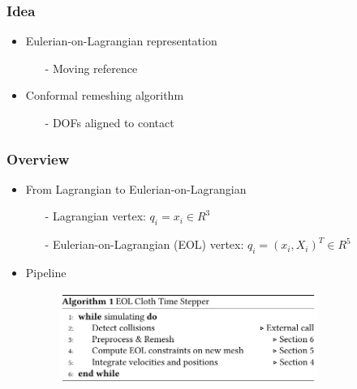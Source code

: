 \documentclass[serif,mathserif, 12pt]{beamer}
\begin{document}
\begin{frame}
  \frametitle{Idea}
  \begin{itemize}
  \item Eulerian-on-Lagrangian representation
    \begin{itemize}
    \item[-] Moving reference
    \end{itemize}
    \pause
  \item Conformal remeshing algorithm
    \begin{itemize}
    \item[-] DOFs aligned to contact
    \end{itemize}
  \end{itemize}
\end{frame}

\begin{frame}
  \frametitle{Overview}
  \begin{itemize}
  \item From Lagrangian to Eulerian-on-Lagrangian
    \begin{itemize}
    \item[-] Lagrangian vertex: $q_i = x_i \in R^3$
    \item[-] Eulerian-on-Lagrangian (EOL) vertex: $q_i = (x_i, X_i)^T \in R^5$
    \end{itemize}
    \pause
  \item Pipeline
    \begin{figure}
      \centering
      \includegraphics[width=0.8\textwidth]{img/algorithm}
    \end{figure}
  \end{itemize}
\end{frame}
\end{document}
